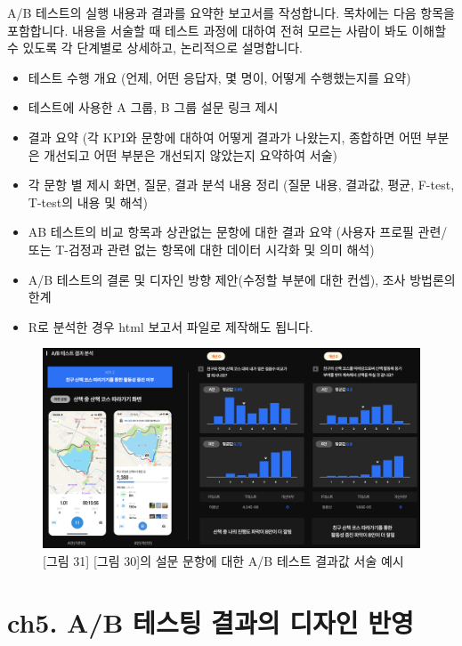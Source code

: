 \documentclass[
  letterpaper,
]{book}
\providecommand{\tightlist}{%
  \setlength{\itemsep}{0pt}\setlength{\parskip}{0pt}}\usepackage{longtable,booktabs,array}
\begin{document}
A/B 테스트의 실행 내용과 결과를 요약한 보고서를 작성합니다. 목차에는
다음 항목을 포함합니다. 내용을 서술할 때 테스트 과정에 대하여 전혀
모르는 사람이 봐도 이해할 수 있도록 각 단계별로 상세하고, 논리적으로
설명합니다.

\begin{itemize}
\tightlist
\item
  테스트 수행 개요 (언제, 어떤 응답자, 몇 명이, 어떻게 수행했는지를
  요약)
\item
  테스트에 사용한 A 그룹, B 그룹 설문 링크 제시
\item
  결과 요약 (각 KPI와 문항에 대하여 어떻게 결과가 나왔는지, 종합하면
  어떤 부분은 개선되고 어떤 부분은 개선되지 않았는지 요약하여 서술)
\item
  각 문항 별 제시 화면, 질문, 결과 분석 내용 정리 (질문 내용, 결과값,
  평균, F-test, T-test의 내용 및 해석)
\item
  AB 테스트의 비교 항목과 상관없는 문항에 대한 결과 요약 (사용자 프로필
  관련/ 또는 T-검정과 관련 없는 항목에 대한 데이터 시각화 및 의미 해석)
\item
  A/B 테스트의 결론 및 디자인 방향 제안(수정할 부분에 대한 컨셉), 조사
  방법론의 한계
\item
  R로 분석한 경우 html 보고서 파일로 제작해도 됩니다.
\end{itemize}

\begin{figure}[H]

{\centering \includegraphics{img/fig31.png}

}

\caption{{[}그림 31{]} {[}그림 30{]}의 설문 문항에 대한 A/B 테스트
결과값 서술 예시}

\end{figure}%

\chapter{ch5. A/B 테스팅 결과의 디자인
반영}\label{ch5.-ab-uxd14cuxc2a4uxd305-uxacb0uxacfcuxc758-uxb514uxc790uxc778-uxbc18uxc601}
\end{document}
